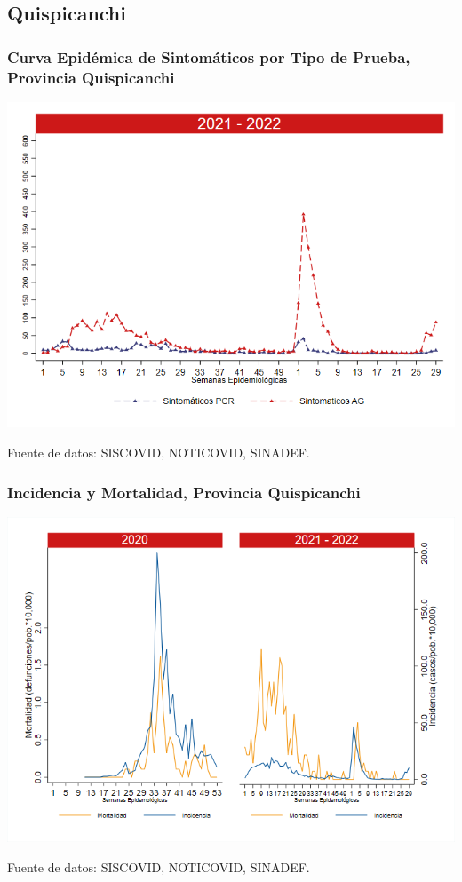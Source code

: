 \documentclass[xcolor=table]{beamer}
\begin{document}
\subsection{Quispicanchi}
\begin{frame}[label=Quispicanchi]
	\frametitle{Curva Epidémica de Sintomáticos por Tipo de Prueba, Provincia Quispicanchi}
	\vspace{-.5cm}
	\begin{center}
		\includegraphics[width=0.8\linewidth, trim={0cm .5cm 0cm 0.2cm},clip]{../figuras/sinto_prueba20_21_12.png}
	\end{center}
	{\tiny Fuente de datos: SISCOVID, NOTICOVID, SINADEF.}
	\hyperlink{TipoPrueba}{}
\end{frame}

\begin{frame}[label=Quispicanchi]
	\frametitle{Incidencia y Mortalidad, Provincia Quispicanchi}
	\vspace{-.5cm}
	\begin{center}
		\includegraphics[width=0.8\linewidth, trim={0cm .5cm 0cm 0.2cm},clip]{../figuras/incidencia_mortalidad_20_21_12.png}
	\end{center}
	{\tiny Fuente de datos: SISCOVID, NOTICOVID, SINADEF.}
\end{frame}
\end{document}
